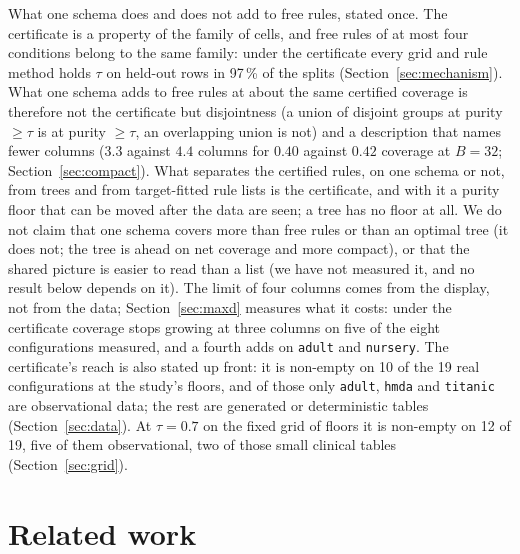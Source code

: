 \documentclass[11pt]{article}
\begin{document}
What one schema does and does not add to free rules, stated once. The certificate is a property of the family of cells, and free rules of at most four conditions belong to the same family: under the certificate every grid and rule method holds $\tau$ on held-out rows in 97\,\% of the splits (Section~\ref{sec:mechanism}). What one schema adds to free rules at about the same certified coverage is therefore not the certificate but disjointness (a union of disjoint groups at purity $\ge\tau$ is at purity $\ge\tau$, an overlapping union is not) and a description that names fewer columns ($3.3$ against $4.4$ columns for $0.40$ against $0.42$ coverage at $B=32$; Section~\ref{sec:compact}). What separates the certified rules, on one schema or not, from trees and from target-fitted rule lists is the certificate, and with it a purity floor that can be moved after the data are seen; a tree has no floor at all. We do not claim that one schema covers more than free rules or than an optimal tree (it does not; the tree is ahead on net coverage and more compact), or that the shared picture is easier to read than a list (we have not measured it, and no result below depends on it). The limit of four columns comes from the display, not from the data; Section~\ref{sec:maxd} measures what it costs: under the certificate coverage stops growing at three columns on five of the eight configurations measured, and a fourth adds on \texttt{adult} and \texttt{nursery}. The certificate's reach is also stated up front: it is non-empty on 10 of the 19 real configurations at the study's floors, and of those only \texttt{adult}, \texttt{hmda} and \texttt{titanic} are observational data; the rest are generated or deterministic tables (Section~\ref{sec:data}). At $\tau=0.7$ on the fixed grid of floors it is non-empty on 12 of 19, five of them observational, two of those small clinical tables (Section~\ref{sec:grid}).

\section{Related work}\label{sec:related}
\end{document}
